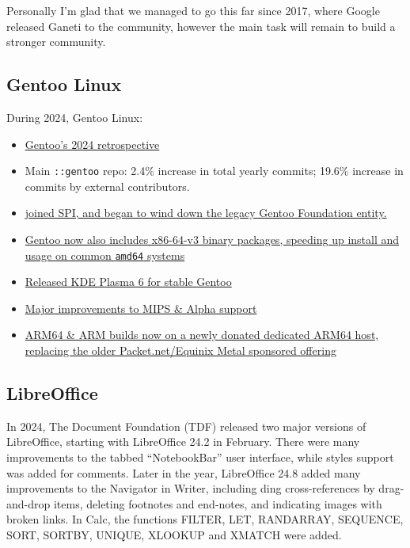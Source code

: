 \documentclass[a4paper]{report}
\begin{document}
Personally I'm glad that we managed to go this far since 2017, where Google released Ganeti to the community, however the main task will remain to build a stronger community.

\subsection{Gentoo Linux}

During 2024, Gentoo Linux:

\begin{itemize}

\item \href{https://www.gentoo.org/news/2025/01/05/new-year.html}{Gentoo's 2024 retrospective}

\item Main {\tt ::gentoo} repo: 2.4\% increase in total yearly commits; 19.6\% increase in commits by external contributors.

\item \href{https://www.gentoo.org/news/2024/04/10/SPI-associated-project.html}{joined SPI, and began to wind down the legacy Gentoo Foundation entity.}

\item \href{https://www.gentoo.org/news/2024/02/04/x86-64-v3.html}{Gentoo now also includes x86-64-v3 binary packages, speeding up install and usage on common {\tt amd64} systems}

\item \href{https://www.gentoo.org/news/2024/08/31/KDE-Plasma-6-upgrade.html}{Released KDE Plasma 6 for stable Gentoo}

\item \href{https://www.gentoo.org/news/2024/09/11/Improved-MIPS-and-Alpha-support.html}{Major improvements to MIPS \& Alpha support}

\item \href{https://www.gentoo.org/news/2024/10/07/Arm-Ltd-provides-server.html}{ARM64 \& ARM builds now on a newly donated dedicated ARM64 host, replacing the older Packet.net/Equinix Metal sponsored offering}

\end{itemize}

\subsection{LibreOffice}

In 2024, The Document Foundation (TDF) released two major versions of LibreOffice, starting with LibreOffice 24.2 in February. There were many improvements to the tabbed “NotebookBar” user interface, while styles support was added for comments. Later in the year, LibreOffice 24.8 added many improvements to the Navigator in Writer, including ding cross-references by drag-and-drop items, deleting footnotes and end-notes, and indicating images with broken links. In Calc, the functions FILTER, LET, RANDARRAY, SEQUENCE, SORT, SORTBY, UNIQUE, XLOOKUP and XMATCH were added.
\end{document}
